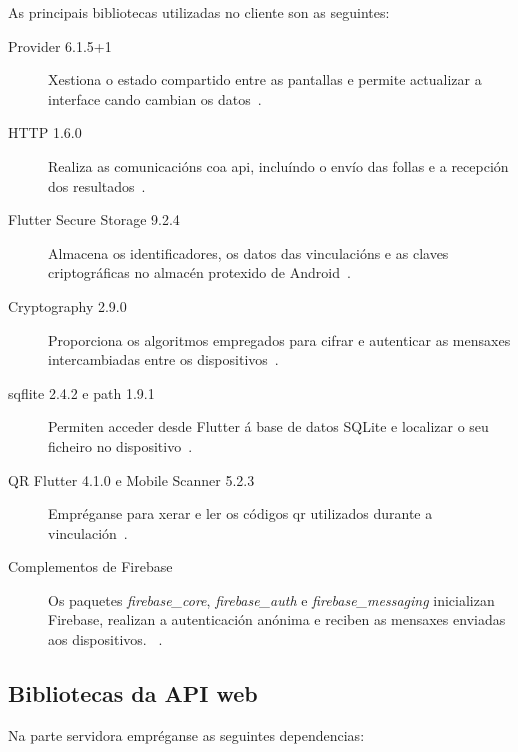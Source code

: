 As principais bibliotecas utilizadas no cliente son as seguintes:

\begin{description}
    \item[Provider 6.1.5+1] Xestiona o estado compartido entre as pantallas e permite actualizar a interface cando cambian os datos~\cite{ProviderPackage}.

    \item[HTTP 1.6.0] Realiza as comunicacións coa \gls{api}, incluíndo o envío das follas e a recepción dos resultados~\cite{DartHttpPackage}.

    \item[Flutter Secure Storage 9.2.4] Almacena os identificadores, os datos das vinculacións e as claves criptográficas no almacén protexido de Android~\cite{FlutterSecureStorage}.

    \item[Cryptography 2.9.0] Proporciona os algoritmos empregados para cifrar e autenticar as mensaxes intercambiadas entre os dispositivos~\cite{CryptographyPackage}.

    \item[sqflite 2.4.2 e path 1.9.1] Permiten acceder desde Flutter á base de datos SQLite e localizar o seu ficheiro no dispositivo~\cite{SqflitePackage}.

    \item[QR Flutter 4.1.0 e Mobile Scanner 5.2.3] Empréganse para xerar e ler os códigos \gls{qr} utilizados durante a vinculación~\cite{QrFlutterPackage,MobileScannerPackage}.

    \item[Complementos de Firebase] Os paquetes \textit{firebase\_core}, \textit{firebase\_auth} e \textit{firebase\_messaging} inicializan Firebase, realizan a autenticación anónima e reciben as mensaxes enviadas aos dispositivos. ~\cite{FirebaseFlutterSetup,FirebaseAuthentication,FirebaseCloudMessaging}.
\end{description}

\subsection{Bibliotecas da API web}

Na parte servidora empréganse as seguintes dependencias:

